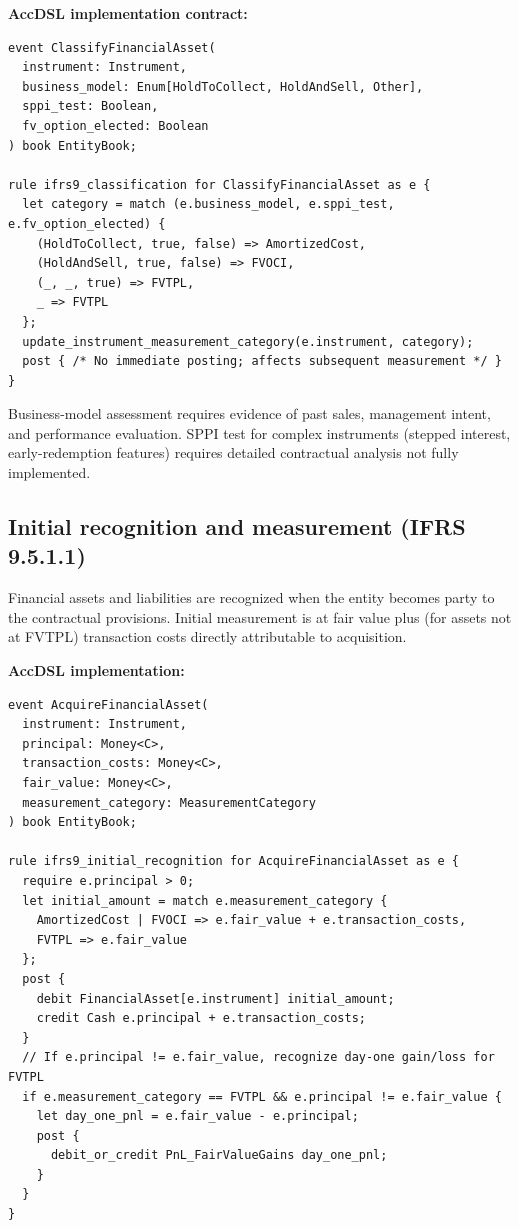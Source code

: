 \textbf{AccDSL implementation contract:}

\begin{lstlisting}
event ClassifyFinancialAsset(
  instrument: Instrument,
  business_model: Enum[HoldToCollect, HoldAndSell, Other],
  sppi_test: Boolean,
  fv_option_elected: Boolean
) book EntityBook;

rule ifrs9_classification for ClassifyFinancialAsset as e {
  let category = match (e.business_model, e.sppi_test, e.fv_option_elected) {
    (HoldToCollect, true, false) => AmortizedCost,
    (HoldAndSell, true, false) => FVOCI,
    (_, _, true) => FVTPL,
    _ => FVTPL
  };
  update_instrument_measurement_category(e.instrument, category);
  post { /* No immediate posting; affects subsequent measurement */ }
}
\end{lstlisting}

 Business-model assessment requires evidence of
past sales, management intent, and performance evaluation. SPPI test for complex
instruments (stepped interest, early-redemption features) requires detailed
contractual analysis not fully implemented.

\subsection{Initial recognition and measurement (IFRS 9.5.1.1)}

Financial assets and liabilities are recognized when the entity becomes party to
the contractual provisions. Initial measurement is at fair value plus (for assets
not at FVTPL) transaction costs directly attributable to acquisition.

\textbf{AccDSL implementation:}

\begin{lstlisting}
event AcquireFinancialAsset(
  instrument: Instrument,
  principal: Money<C>,
  transaction_costs: Money<C>,
  fair_value: Money<C>,
  measurement_category: MeasurementCategory
) book EntityBook;

rule ifrs9_initial_recognition for AcquireFinancialAsset as e {
  require e.principal > 0;
  let initial_amount = match e.measurement_category {
    AmortizedCost | FVOCI => e.fair_value + e.transaction_costs,
    FVTPL => e.fair_value
  };
  post {
    debit FinancialAsset[e.instrument] initial_amount;
    credit Cash e.principal + e.transaction_costs;
  }
  // If e.principal != e.fair_value, recognize day-one gain/loss for FVTPL
  if e.measurement_category == FVTPL && e.principal != e.fair_value {
    let day_one_pnl = e.fair_value - e.principal;
    post {
      debit_or_credit PnL_FairValueGains day_one_pnl;
    }
  }
}
\end{lstlisting}

